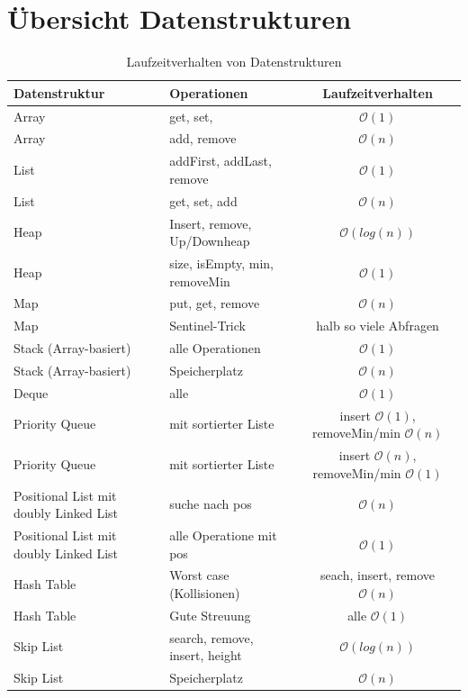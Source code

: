 \section{Übersicht Datenstrukturen}
\begin{table}[h]
	\centering
	\begin{tabu} to \linewidth {X X c}
		\toprule
		Datenstruktur & Operationen & Laufzeitverhalten \\
		\midrule
		Array & get, set,   & $\mathcal{O}(1)$  \\
		Array & add, remove & $\mathcal{O}(n)$  \\
		List & addFirst, addLast, remove & $\mathcal{O}(1)$  \\
		List & get, set, add & $\mathcal{O}(n)$  \\
		Heap & Insert, remove, Up/Downheap & $\mathcal{O}(log(n))$  \\
		Heap & size, isEmpty, min, removeMin & $\mathcal{O}(1)$\\
		Map & put, get, remove & $\mathcal{O}(n)$ \\
		Map & Sentinel-Trick & halb so viele Abfragen \\
		Stack (Array-basiert) & alle Operationen & $\mathcal{O}(1)$ \\
		Stack (Array-basiert) & Speicherplatz & $\mathcal{O}(n)$ \\
		Deque & alle & $\mathcal{O}(1)$ \\
		Priority Queue & mit sortierter Liste & insert $\mathcal{O}(1)$, removeMin/min $\mathcal{O}(n)$\\
		Priority Queue & mit sortierter Liste & insert $\mathcal{O}(n)$, removeMin/min $\mathcal{O}(1)$\\
		Positional List mit doubly Linked List & suche nach pos & $\mathcal{O}(n)$ \\
		Positional List mit doubly Linked List & alle Operatione mit pos & $\mathcal{O}(1)$ \\
		Hash Table & Worst case (Kollisionen) & seach, insert, remove $\mathcal{O}(n)$ \\
		Hash Table & Gute Streuung & alle $\mathcal{O}(1)$ \\
		Skip List & search, remove, insert, height & $\mathcal{O}(log(n))$ \\
		Skip List & Speicherplatz & $\mathcal{O}(n)$ \\
		\bottomrule
	\end{tabu}
	\caption{Laufzeitverhalten von Datenstrukturen}
\end{table}

